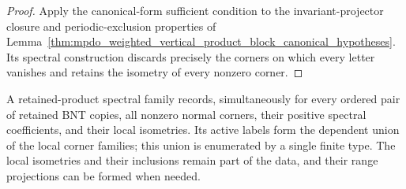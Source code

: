 \begin{proof}\leanok
    Apply the canonical-form sufficient condition to the invariant-projector
    closure and periodic-exclusion properties of
    Lemma~\ref{thm:mpdo_weighted_vertical_product_block_canonical_hypotheses}. Its
    spectral construction discards precisely the corners on which every
    letter vanishes and retains the isometry of every nonzero corner.
\end{proof}

\begin{definition}
    \label{def:mpdo_retained_product_spectral_family}
    \leanok
    A retained-product spectral family records, simultaneously for every
    ordered pair of retained BNT copies, all nonzero normal corners, their
    positive spectral coefficients, and their local isometries. Its active
    labels form the dependent union of the local corner families; this union
    is enumerated by a single finite type. The local isometries and their
    inclusions remain part of the data, and their range projections can be
    formed when needed.
\end{definition}

